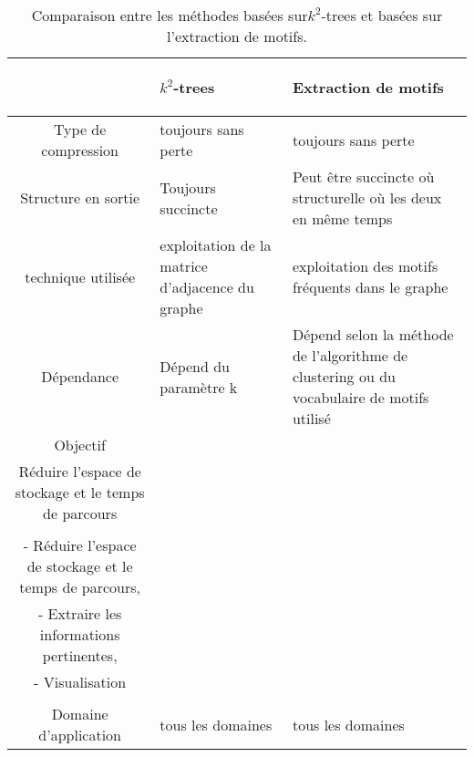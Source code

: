  
\begin{table}[H]
\begin{tabular}{|c|p{6cm}|p{4cm}|}

\hline & \begin{center}
\textbf{$k^2$-trees}
\end{center}     &  \begin{center} \textbf{Extraction de motifs} \end{center}  \\
										
										
\hline Type de compression & toujours sans perte & toujours sans perte \\
\hline Structure en sortie & Toujours succincte & Peut être succincte où structurelle où les deux en même temps\\

\hline technique utilisée & exploitation de la matrice d'adjacence du graphe & exploitation des motifs fréquents dans le graphe\\

\hline Dépendance & Dépend du paramètre k & Dépend selon la méthode de l'algorithme de clustering ou du vocabulaire de motifs utilisé  \\

\hline Objectif & 
\begin{minipage}[t]{0.35\textwidth}
  			Compression,\\
  			Réduire l'espace de stockage et le temps de parcours\\
  \end{minipage}
  &
  \begin{minipage}[t]{0.25\textwidth}
  			- Compression,\\
  			- Réduire l'espace de  stockage et le temps de parcours,\\
  			- Extraire les informations pertinentes, \\
  			- Visualisation \\
  \end{minipage}
  \\
  \hline Domaine d'application & tous les domaines & tous les domaines \\
  \hline
\end{tabular}
									\caption{Comparaison entre les méthodes basées sur$k^2$-trees et basées sur l'extraction de motifs.}									\label{comgen}
									
								\end{table}
